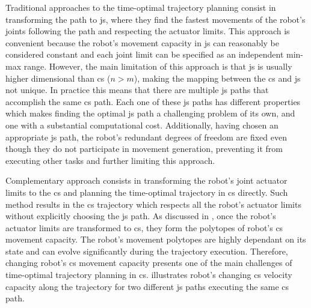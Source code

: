 Traditional approaches to the time-optimal trajectory planning consist in transforming the path to \gls{js}, where they find the fastest movements of the robot's joints following the path and respecting the actuator limits.
This approach is convenient because the robot's movement capacity in \gls{js} can reasonably be considered constant and each joint limit can be specified as an independent min-max range. 
However, the main limitation of this approach is that \gls{js} is usually higher dimensional than \gls{cs} ($n>m$), making the mapping between the \gls{cs} and \gls{js} not unique. In practice this means that there are multiple \gls{js} paths that accomplish the same \gls{cs} path. Each one of these \gls{js} paths has different properties which makes finding the optimal \gls{js} path a challenging problem of its own, and one with a substantial computational cost. Additionally, having chosen an appropriate \gls{js} path, the robot's redundant degrees of freedom are fixed even though they do not participate in movement generation, preventing it from executing other tasks and further limiting this approach.

Complementary approach consists in transforming the robot’s joint actuator limits to the \gls{cs} and planning the time-optimal trajectory in \gls{cs} directly.
Such method results in the \gls{cs} trajectory which respects all the robot's actuator limits without explicitly choosing the \gls{js} path. 
As discussed in , once the robot's actuator limits are transformed to \gls{cs}, they form the polytopes of robot's \gls{cs} movement capacity.
The robot's movement polytopes are highly dependant on its state and can evolve significantly during the trajectory execution. 
Therefore, changing robot's \gls{cs} movement capacity presents one of the main challenges of time-optimal trajectory planning in \gls{cs}. 
 illustrates robot's changing \gls{cs} velocity capacity along the trajectory for two different \gls{js} paths executing the same \gls{cs} path. 

